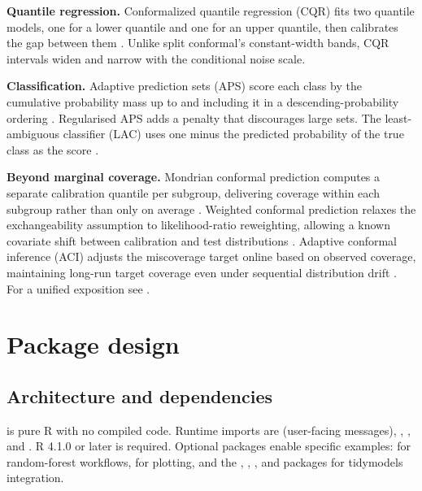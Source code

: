 \textbf{Quantile regression.} Conformalized quantile regression (CQR) fits two
quantile models, one for a lower quantile and one for an upper quantile, then
calibrates the gap between them \citep{romano2019conformalized}. Unlike split
conformal's constant-width bands, CQR intervals widen and narrow with the
conditional noise scale.

\textbf{Classification.} Adaptive prediction sets (APS) score each class by the
cumulative probability mass up to and including it in a descending-probability
ordering \citep{romano2020classification}. Regularised APS
\citep{angelopoulos2021uncertainty} adds a penalty that discourages large sets.
The least-ambiguous classifier (LAC) uses one minus the predicted probability
of the true class as the score \citep{sadinle2019least}.

\textbf{Beyond marginal coverage.} Mondrian conformal prediction computes a
separate calibration quantile per subgroup, delivering coverage within each
subgroup rather than only on average \citep{vovk2005algorithmic}. Weighted
conformal prediction relaxes the exchangeability assumption to likelihood-ratio
reweighting, allowing a known covariate shift between calibration and test
distributions \citep{tibshirani2019conformal}. Adaptive conformal inference (ACI)
adjusts the miscoverage target online based on observed coverage, maintaining
long-run target coverage even under sequential distribution drift
\citep{gibbs2021adaptive}. For a unified exposition see
\citet{angelopoulos2023gentle}.

\section{Package design}\label{package-design}

\subsection{Architecture and dependencies}\label{architecture-and-dependencies}

 is pure R with no compiled code. Runtime imports are
 (user-facing messages), , , and
. R 4.1.0 or later is required. Optional packages enable specific
examples:  for random-forest workflows,  for
plotting, and the , , ,
and  packages for tidymodels integration.

